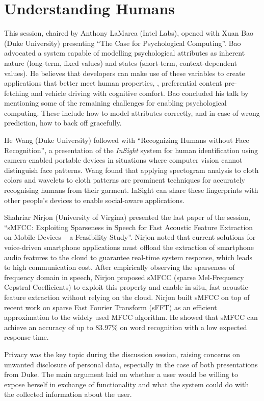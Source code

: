 \section{Understanding Humans}
\label{sec:humans}

This session, chaired by Anthony LaMarca (Intel Labs), opened with Xuan
Bao (Duke University) presenting ``The Case for Psychological
Computing''. Bao advocated a system capable of modelling psychological
attributes as inherent nature (long-term, fixed values) and states
(short-term, context-dependent values). He believes that developers can
make use of these variables to create applications that better meet
human properties, \eg, preferential content pre-fetching and vehicle
driving with cognitive comfort. Bao concluded his talk by mentioning
some of the remaining challenges for enabling psychological computing.
These include how to model attributes correctly, and in case of wrong
prediction, how to back off gracefully.

He Wang (Duke University) followed with ``Recognizing Humans without Face
Recognition'', a presentation of the \emph{InSight} system for human
identification using camera-enabled portable devices in situations where
computer vision cannot distinguish face patterns. Wang found that
applying spectogram analysis to cloth colors and wavelets to cloth
patterns are prominent techniques for accurately recognising humans from
their garment. InSight can share these fingerprints with other people's
devices to enable social-aware applications.

Shahriar Nirjon (University of Virgina) presented the last paper of
the session, ``sMFCC: Exploiting Sparseness in Speech for Fast Acoustic
Feature Extraction on Mobile Devices -- a Feasibility Study''. Nirjon
noted that current solutions for voice-driven smartphone applications
must offload the extraction of smartphone audio features to the cloud to
guarantee real-time system response, which leads to high communication
cost. After empirically observing the sparseness of frequency domain in
speech, Nirjon proposed sMFCC (sparse Mel-Frequency Cepstral
Coefficients) to exploit this property and enable in-situ, fast
acoustic-feature extraction without relying on the cloud. Nirjon built
sMFCC on top of recent work on sparse Fast Fourier Transform (sFFT) as
an efficient approximation to the widely used MFCC algorithm. He showed
that sMFCC can achieve an accuracy of up to $83.97\%$ on word
recognition with a low expected response time.

Privacy was the key topic during the discussion session, raising
concerns on unwanted disclosure of personal data, especially in the case
of both presentations from Duke. The main argument laid on whether a
user would be willing to expose herself in exchange of functionality and
what the system could do with the collected information about the user.

